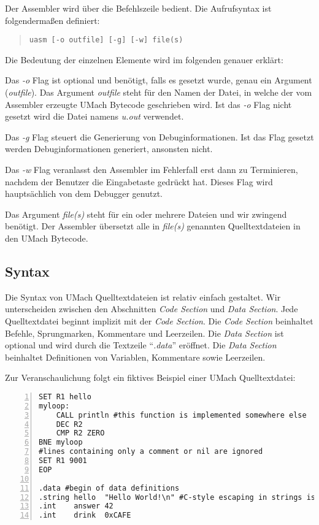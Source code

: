Der Assembler wird über die Befehlszeile bedient. Die Aufrufsyntax ist folgendermaßen
definiert:
\begin{quote}\texttt{uasm [-o outfile] [-g] [-w] file(s)}\end{quote}
Die Bedeutung der einzelnen Elemente wird im folgenden genauer erklärt:

Das \emph{-o} Flag ist optional und benötigt, falls es gesetzt wurde, genau ein
Argument (\emph{outfile}). Das Argument \emph{outfile} steht für den Namen der
Datei, in welche der vom Assembler erzeugte UMach Bytecode geschrieben wird. Ist 
das \emph{-o} Flag nicht gesetzt wird die Datei namens \emph{u.out} verwendet.

Das \emph{-g} Flag steuert die Generierung von Debuginformationen. Ist das Flag
gesetzt werden Debuginformationen generiert, ansonsten nicht.

Das \emph{-w} Flag veranlasst den Assembler im Fehlerfall erst dann zu Terminieren,
nachdem der Benutzer die Eingabetaste gedrückt hat. Dieses Flag wird hauptsächlich
von dem Debugger genutzt.

Das Argument \emph{file(s)} steht für ein oder mehrere Dateien und wir zwingend
benötigt. Der Assembler übersetzt alle in \emph{file(s)} genannten Quelltextdateien
in den UMach Bytecode.

\subsection{Syntax}

Die Syntax von UMach Quelltextdateien ist relativ einfach gestaltet. Wir
unterscheiden zwischen den Abschnitten \emph{Code Section} und \emph{Data Section}.
Jede Quelltextdatei beginnt implizit mit der \emph{Code Section}. Die
\emph{Code Section} beinhaltet Befehle, Sprungmarken, Kommentare und Leerzeilen.
Die \emph{Data Section} ist optional und wird durch die Textzeile ``\emph{.data}''
eröffnet. Die \emph{Data Section} beinhaltet Definitionen von Variablen,
Kommentare sowie Leerzeilen.

Zur Veranschaulichung folgt ein fiktives Beispiel einer UMach Quelltextdatei:

\begin{lstlisting}[numbers=left, numberstyle=\tiny]
SET R1 hello
myloop:
    CALL println #this function is implemented somewhere else
    DEC R2
    CMP R2 ZERO
BNE myloop
#lines containing only a comment or nil are ignored
SET R1 9001
EOP

.data #begin of data definitions
.string hello  "Hello World!\n" #C-style escaping in strings is OK
.int    answer 42
.int    drink  0xCAFE
\end{lstlisting}

